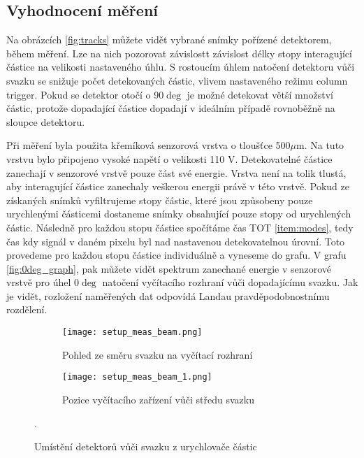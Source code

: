 \subsection{Vyhodnocení měření}
	Na obrázcích \ref{fig:tracks} můžete vidět vybrané snímky pořízené detektorem, během měření. Lze na nich pozorovat závislostt závislost délky stopy interagující částice na velikosti nastaveného úhlu. S rostoucím úhlem natočení detektoru vůči svazku se snižuje počet detekovaných částic, vlivem nastaveného režimu column trigger. Pokud se detektor otočí o 90$\deg$ je možné detekovat větší množství částic, protože dopadající částice dopadají v ideálním případě rovnoběžně na sloupce detektoru.
	
	\par
	Při měření byla použita křemíková senzorová vrstva o tloušťce 500$\mu$m. Na tuto vrstvu bylo připojeno vysoké napětí o velikosti 110 V. Detekovatelné částice zanechají v senzorové vrstvě pouze část své energie. Vrstva není na tolik tlustá, aby interagující částice zanechaly veškerou energii právě v této vrstvě. Pokud ze získaných snímků vyfiltrujeme stopy částic, které jsou způsobeny pouze urychlenými částicemi dostaneme snímky obsahující pouze stopy od urychlených částic. Následně pro každou stopu částice spočítáme čas TOT \ref{item:modes}, tedy čas kdy signál v daném pixelu byl nad nastavenou detekovatelnou úrovní. Toto provedeme pro každou stopu částice individuálně a vyneseme do grafu. V grafu \ref{fig:0deg_graph}, pak můžete vidět spektrum zanechané energie v senzorové vrstvě pro úhel 0$\deg$ natočení vyčítacího rozhraní vůči dopadajícímu svazku. Jak je vidět, rozložení naměřených dat odpovídá Landau pravděpodobnostnímu rozdělení. %
	
	\begin{figure}[h!]
		\captionsetup{justification=centering}
		\begin{subfigure}{0.5\textwidth}
			\centering
			\texttt{[image: setup\_meas\_beam.png]}
			\caption{Pohled ze směru svazku na vyčítací rozhraní}
			\label{fig:setup_meas_beam}
		\end{subfigure}
		\begin{subfigure}{0.5\textwidth}
			\centering
			\texttt{[image: setup\_meas\_beam\_1.png]}
			\caption{Pozice vyčítacího zařízení vůči středu svazku}
			\label{fig:setup_meas_beam_1}
		\end{subfigure}
		\caption{Umístění detektorů vůči svazku z urychlovače částic}. %
		\label{fig:setum_beam}
	\end{figure}
	
